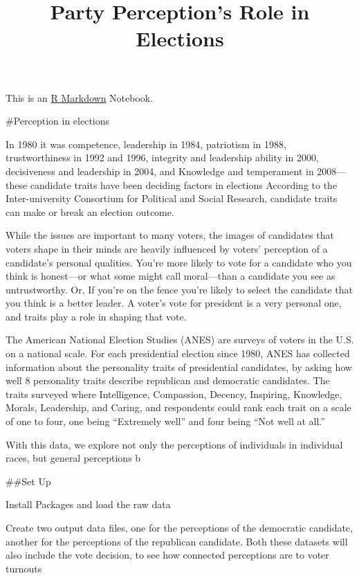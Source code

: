 \documentclass[
]{article}
\title{Party Perception's Role in Elections}
\author{}
\date{\vspace{-2.5em}}
\begin{document}
\maketitle

This is an \href{http://rmarkdown.rstudio.com}{R Markdown} Notebook.

\#Perception in elections

In 1980 it was competence, leadership in 1984, patriotism in 1988,
trustworthiness in 1992 and 1996, integrity and leadership ability in
2000, decisiveness and leadership in 2004, and Knowledge and temperament
in 2008---these candidate traits have been deciding factors in elections
According to the Inter-university Consortium for Political and Social
Research, candidate traits can make or break an election outcome.

While the issues are important to many voters, the images of candidates
that voters shape in their minds are heavily influenced by voters'
perception of a candidate's personal qualities. You're more likely to
vote for a candidate who you think is honest---or what some might call
moral---than a candidate you see as untrustworthy. Or, If you're on the
fence you're likely to select the candidate that you think is a better
leader. A voter's vote for president is a very personal one, and traits
play a role in shaping that vote.

The American National Election Studies (ANES) are surveys of voters in
the U.S. on a national scale. For each presidential election since 1980,
ANES has collected information about the personality traits of
presidential candidates, by asking how well 8 personality traits
describe republican and democratic candidates. The traits surveyed where
Intelligence, Compassion, Decency, Inspiring, Knowledge, Morals,
Leadership, and Caring, and respondents could rank each trait on a scale
of one to four, one being ``Extremely well'' and four being ``Not well
at all.''

With this data, we explore not only the perceptions of individuals in
individual races, but general perceptions b

\#\#Set Up

Install Packages and load the raw data

Create two output data files, one for the perceptions of the democratic
candidate, another for the perceptions of the republican candidate. Both
these datasets will also include the vote decision, to see how connected
perceptions are to voter turnouts
\end{document}
